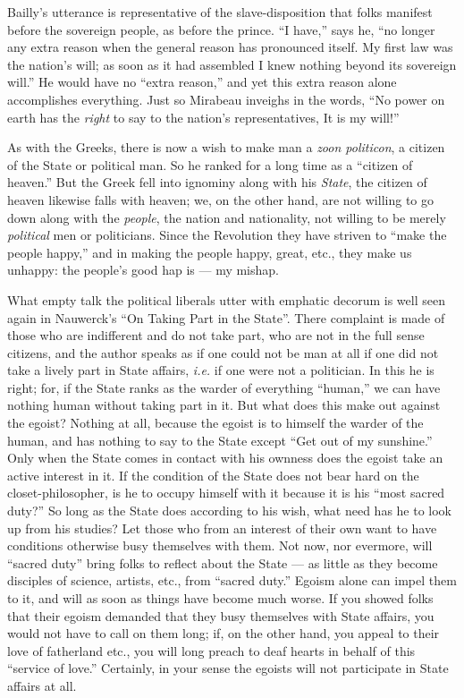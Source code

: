 Bailly's utterance is representative of the slave-disposition that folks 
manifest before the sovereign people, as before the prince. ``I have,'' says 
he, ``no longer any extra reason when the general reason has pronounced 
itself. My first law was the nation's will; as soon as it had assembled I knew 
nothing beyond its sovereign will.'' He would have no ``extra reason,'' and 
yet this extra reason alone accomplishes everything. Just so Mirabeau inveighs 
in the words, ``No power on earth has the \textit{right} to say to the 
nation's representatives, It is my will!''

As with the Greeks, there is now a wish to make man a \textit{zoon politicon}, 
a citizen of the State or political man. So he ranked for a long time as a 
``citizen of heaven.'' But the Greek fell into ignominy along with his 
\textit{State}, the citizen of heaven likewise falls with heaven; we, on the 
other hand, are not willing to go down along with the \textit{people}, the 
nation and nationality, not willing to be merely \textit{political} men or 
politicians. Since the Revolution they have striven to ``make the people 
happy,'' and in making the people happy, great, etc., they make us unhappy: 
the people's good hap is --- my mishap.

What empty talk the political liberals utter with emphatic decorum is well 
seen again in Nauwerck's ``On Taking Part in the State''. There complaint is 
made of those who are indifferent and do not take part, who are not in the 
full sense citizens, and the author speaks as if one could not be man at all 
if one did not take a lively part in State affairs, \textit{i.e.} if one were 
not a politician. In this he is right; for, if the State ranks as the warder 
of everything ``human,'' we can have nothing human without taking part in 
it. But what does this make out against the egoist? Nothing at all, because 
the egoist is to himself the warder of the human, and has nothing to say to 
the State except ``Get out of my sunshine.'' Only when the State comes in 
contact with his ownness does the egoist take an active interest in it. If the 
condition of the State does not bear hard on the closet-philosopher, is he to 
occupy himself with it because it is his ``most sacred duty?'' So long as 
the State does according to his wish, what need has he to look up from his 
studies? Let those who from an interest of their own want to have conditions 
otherwise busy themselves with them. Not now, nor evermore, will ``sacred 
duty'' bring folks to reflect about the State --- as little as they become 
disciples of science, artists, etc., from ``sacred duty.'' Egoism alone can 
impel them to it, and will as soon as things have become much worse. If you 
showed folks that their egoism demanded that they busy themselves with State 
affairs, you would not have to call on them long; if, on the other hand, you 
appeal to their love of fatherland etc., you will long preach to deaf hearts 
in behalf of this ``service of love.'' Certainly, in your sense the egoists 
will not participate in State affairs at all.

